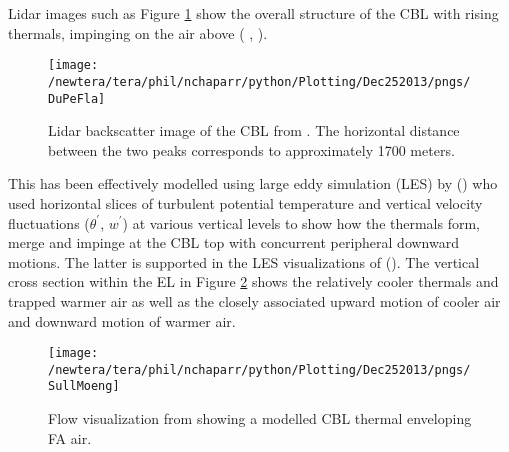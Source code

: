 Lidar images such as Figure \ref{fig:DuPeFla} show the overall structure of the \acs{CBL} with rising thermals, impinging on the air above (\citeauthor{CrumStullEl} \citeyear{CrumStullEl}, \citeauthor{Traum11} \citeyear{Traum11}).  

\begin{figure}[htbp]
    \centering
    \texttt{[image: /newtera/tera/phil/nchaparr/python/Plotting/Dec252013/pngs/DuPeFla]}
    \caption[Lidar backscatter image of the \acs{CBL}]{Lidar backscatter image of the \acs{CBL} from \citeauthor{DuPeFla} \citeyear{DuPeFla}.  The horizontal distance between the two peaks corresponds to approximately 1700 meters.}
    \label{fig:DuPeFla}   %
\end{figure}

This has been effectively modelled using large eddy simulation (\acs{LES}) by \citeauthor{SchmidtSchu} (\citeyear{SchmidtSchu}) who used horizontal slices of turbulent potential temperature and vertical velocity fluctuations ($\theta^{'}$, $w^{'}$) at various vertical levels to show how the thermals form, merge and impinge at the \acs{CBL} top with concurrent peripheral downward motions.  The latter is supported in the \acs{LES} visualizations of \citeauthor{SullMoengStev} (\citeyear{SullMoengStev}).  The vertical cross section within the \acs{EL} in Figure \ref{fig:SullMoeng} shows the relatively cooler thermals and trapped warmer air as well as the closely associated upward motion of cooler air and downward motion of warmer air.\\ 

\begin{figure}[htbp]
    \centering
    \texttt{[image: /newtera/tera/phil/nchaparr/python/Plotting/Dec252013/pngs/SullMoeng]}
    \caption[Visualization of entrainment from an \acs{LES}]{Flow visualization from \citeauthor{SullMoengStev} \citeyear{SullMoengStev} showing a modelled \acs{CBL} thermal enveloping \acs{FA} air.}
    \label{fig:SullMoeng}   %
\end{figure}

